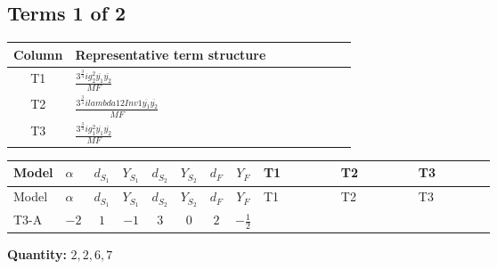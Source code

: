 \documentclass[8pt]{article}
\begin{document}
\begin{landscape}
\subsection*{Terms 1 of 2}
\begin{center}
\begin{tabular}{@{}c >{\raggedright\arraybackslash}p{0.82\linewidth}@{}}
\toprule
Column & Representative term structure \\
\midrule
T1 & \(\displaystyle \frac{3^{\frac{3}{4}} i g_{2}^{2} \overline{y_{1}} \overline{y_{2}}}{MF}\) \\
\midrule
T2 & \(\displaystyle \frac{3^{\frac{3}{4}} i lambda12Inv1 \overline{y_{1}} \overline{y_{2}}}{MF}\) \\
\midrule
T3 & \(\displaystyle \frac{3^{\frac{3}{4}} i g_{1}^{2} \overline{y_{1}} \overline{y_{2}}}{MF}\) \\
\midrule
\bottomrule
\end{tabular}
\end{center}
\smallskip
\tiny
\begin{longtable}{@{}llcccccc >{\raggedright\arraybackslash}p{0.21\linewidth} >{\raggedright\arraybackslash}p{0.21\linewidth} >{\raggedright\arraybackslash}p{0.21\linewidth}@{}}
\toprule
Model & $\alpha$ & $d_{S_1}$ & $Y_{S_1}$ & $d_{S_2}$ & $Y_{S_2}$ & $d_F$ & $Y_F$ & T1 & T2 & T3 \\
\midrule
\endfirsthead
\toprule
Model & $\alpha$ & $d_{S_1}$ & $Y_{S_1}$ & $d_{S_2}$ & $Y_{S_2}$ & $d_F$ & $Y_F$ & T1 & T2 & T3 \\
\midrule
\endhead
T3-A & $-2$ & $1$ & $-1$ & $3$ & $0$ & $2$ & $-\frac{1}{2}$ & \scriptsize\adjustbox{max width=\linewidth}{$\begin{gathered} - \frac{17 \cdot 3^{\frac{3}{4}} i g_{2}^{2} \overline{y_{1}} \overline{y_{2}}}{24 MF}\end{gathered}$} & \scriptsize\adjustbox{max width=\linewidth}{$\begin{gathered} - \frac{3^{\frac{3}{4}} i lambda12Inv1 \overline{y_{1}} \overline{y_{2}}}{6 MF}\end{gathered}$} & \scriptsize\adjustbox{max width=\linewidth}{$\begin{gathered} - \frac{3^{\frac{3}{4}} i g_{1}^{2} \overline{y_{1}} \overline{y_{2}}}{8 MF}\end{gathered}$} \\
\midrule
\bottomrule
\end{longtable}
\clearpage
\noindent\textbf{Quantity: }$\mathrm{2,2,6,7}$\par\smallskip

\end{landscape}
\end{document}
